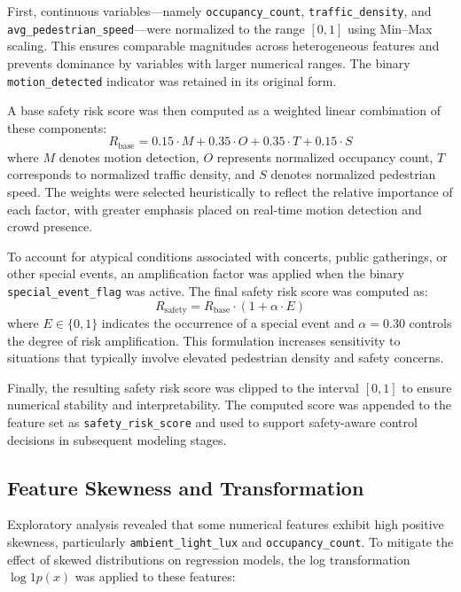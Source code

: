 \documentclass[conference]{IEEEtran}
\begin{document}
First, continuous variables—namely \texttt{occupancy\_count}, \texttt{traffic\_density}, and \texttt{avg\_pedestrian\_speed}—were normalized to the range $[0,1]$ using Min--Max scaling. This ensures comparable magnitudes across heterogeneous features and prevents dominance by variables with larger numerical ranges. The binary \texttt{motion\_detected} indicator was retained in its original form.

A base safety risk score was then computed as a weighted linear combination of these components:
\begin{equation}
R_{\text{base}} = 0.15 \cdot M + 0.35 \cdot O + 0.35 \cdot T + 0.15 \cdot S
\end{equation}
where $M$ denotes motion detection, $O$ represents normalized occupancy count, $T$ corresponds to normalized traffic density, and $S$ denotes normalized pedestrian speed. The weights were selected heuristically to reflect the relative importance of each factor, with greater emphasis placed on real-time motion detection and crowd presence.

To account for atypical conditions associated with concerts, public gatherings, or other special events, an amplification factor was applied when the binary \texttt{special\_event\_flag} was active. The final safety risk score was computed as:
\begin{equation}
R_{\text{safety}} = R_{\text{base}} \cdot \left(1 + \alpha \cdot E \right)
\end{equation}
where $E \in \{0,1\}$ indicates the occurrence of a special event and $\alpha = 0.30$ controls the degree of risk amplification. This formulation increases sensitivity to situations that typically involve elevated pedestrian density and safety concerns.

Finally, the resulting safety risk score was clipped to the interval $[0,1]$ to ensure numerical stability and interpretability. The computed score was appended to the feature set as \texttt{safety\_risk\_score} and used to support safety-aware control decisions in subsequent modeling stages.

\subsection{Feature Skewness and Transformation}

Exploratory analysis revealed that some numerical features exhibit high positive skewness, particularly \texttt{ambient\_light\_lux} and \texttt{occupancy\_count}. To mitigate the effect of skewed distributions on regression models, the log transformation $\log1p(x)$ was applied to these features:
\end{document}
